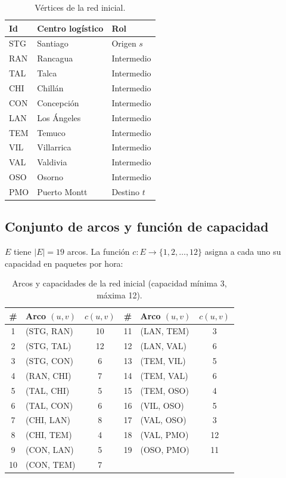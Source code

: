\documentclass[12pt, a4paper]{article}
\begin{document}
\begin{table}[H]
  \centering
  \begin{tabular}{lll}
    \toprule
    \textbf{Id} & \textbf{Centro logístico} & \textbf{Rol} \\
    \midrule
    STG & Santiago     & Origen $s$ \\
    RAN & Rancagua     & Intermedio \\
    TAL & Talca        & Intermedio \\
    CHI & Chillán      & Intermedio \\
    CON & Concepción   & Intermedio \\
    LAN & Los Ángeles  & Intermedio \\
    TEM & Temuco       & Intermedio \\
    VIL & Villarrica   & Intermedio \\
    VAL & Valdivia     & Intermedio \\
    OSO & Osorno       & Intermedio \\
    PMO & Puerto Montt & Destino $t$ \\
    \bottomrule
  \end{tabular}
  \caption{Vértices de la red inicial.}
  \label{tab:vertices}
\end{table}

\subsection{Conjunto de arcos y función de capacidad}

$E$ tiene $\lvert E\rvert = 19$ arcos. La función $c: E \to \{1, 2, \dots, 12\}$ asigna a cada uno su capacidad en paquetes por hora:

\begin{table}[H]
  \centering
  \begin{tabular}{clc@{\hspace{1.2cm}}clc}
    \toprule
    \textbf{\#} & \textbf{Arco $(u,v)$} & \textbf{$c(u,v)$} & \textbf{\#} & \textbf{Arco $(u,v)$} & \textbf{$c(u,v)$} \\
    \midrule
    1  & (STG, RAN) & 10 & 11 & (LAN, TEM) & 3  \\
    2  & (STG, TAL) & 12 & 12 & (LAN, VAL) & 6  \\
    3  & (STG, CON) & 6  & 13 & (TEM, VIL) & 5  \\
    4  & (RAN, CHI) & 7  & 14 & (TEM, VAL) & 6  \\
    5  & (TAL, CHI) & 5  & 15 & (TEM, OSO) & 4  \\
    6  & (TAL, CON) & 6  & 16 & (VIL, OSO) & 5  \\
    7  & (CHI, LAN) & 8  & 17 & (VAL, OSO) & 3  \\
    8  & (CHI, TEM) & 4  & 18 & (VAL, PMO) & 12 \\
    9  & (CON, LAN) & 5  & 19 & (OSO, PMO) & 11 \\
    10 & (CON, TEM) & 7  &    &            &    \\
    \bottomrule
  \end{tabular}
  \caption{Arcos y capacidades de la red inicial (capacidad mínima 3, máxima 12).}
  \label{tab:arcos}
\end{table}
\end{document}
